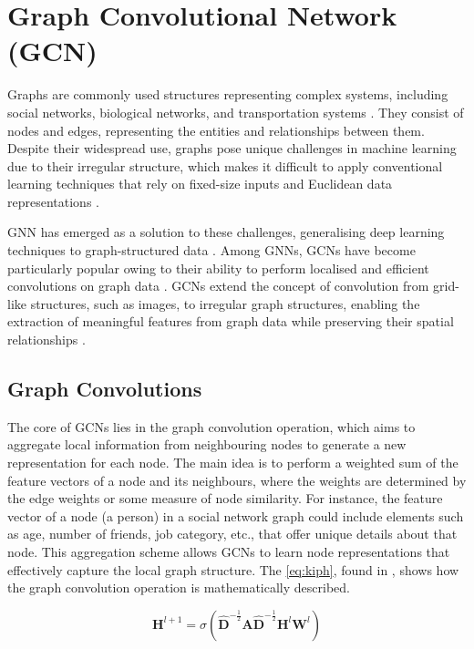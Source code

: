 \section{Graph Convolutional Network (GCN)}
Graphs are commonly used structures representing complex systems, including social networks, biological networks, and transportation systems \autocite{scarselli2008graph}. They consist of nodes and edges, representing the entities and relationships between them. Despite their widespread use, graphs pose unique challenges in machine learning due to their irregular structure, which makes it difficult to apply conventional learning techniques that rely on fixed-size inputs and Euclidean data representations \autocite{battaglia2018relational}.

\Gls{GNN} has emerged as a solution to these challenges, generalising deep learning techniques to graph-structured data \autocite{gori2005new}. Among \glspl{GNN}, \glspl{GCN} have become particularly popular owing to their ability to perform localised and efficient convolutions on graph data \autocite{DBLP:journals/corr/KipfW16}. \glspl{GCN} extend the concept of convolution from grid-like structures, such as images, to irregular graph structures, enabling the extraction of meaningful features from graph data while preserving their spatial relationships \autocite{bronstein2017geometric}. 

\subsection{Graph Convolutions}
The core of \glspl{GCN} lies in the graph convolution operation, which aims to aggregate local information from neighbouring nodes to generate a new representation for each node. The main idea is to perform a weighted sum of the feature vectors of a node and its neighbours, where the weights are determined by the edge weights or some measure of node similarity. For instance, the feature vector of a node (a person) in a social network graph could include elements such as age, number of friends, job category, etc., that offer unique details about that node.  This aggregation scheme allows \glspl{GCN} to learn node representations that effectively capture the local graph structure. The \cref{eq:kiph}, found in \autocite{DBLP:journals/corr/KipfW16}, shows how the graph convolution operation is mathematically described.

\begin{equation} 
    \bm{H}^{l+1} = \sigma(\bm{\hat{D}}^{-\frac{1}{2}} \bm{A} \bm{\hat{D}}^{-\frac{1}{2}} \bm{H}^{l} \bm{W}^{l} )
    \label{eq:kiph}
\end{equation}


